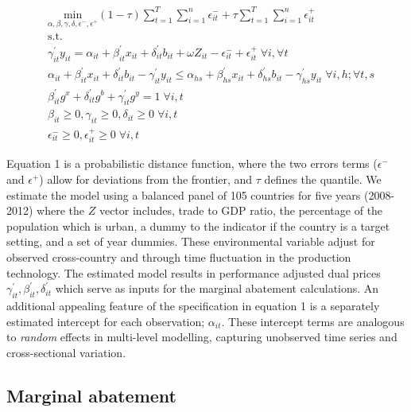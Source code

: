 \documentclass[
  10pt,
]{article}
\begin{document}
\begin{equation}
\begin{split}
& \underset{\alpha,\beta,\gamma,\delta,\epsilon^-,\epsilon^+}{\text{min}}
 (1-\tau) \sum^{T}_{t=1} \sum^{n}_{i=1}\epsilon^-_{it} + \tau \sum^{T}_{t=1}  \sum^{n}_{i=1}\epsilon^+_{it}  \\
&\text{s.t.} \\
&\gamma^{'}_{it}y_{it}=\alpha_{it}+\beta^{'}_{it}x_{it}+\delta^{'}_{it}b_{it} + \omega Z_{it} -\epsilon^-_{it}+\epsilon^+_{it} \; \forall i ,\forall t \\
&\alpha_{it}+\beta^{'}_{it}x_{it}+\delta^{'}_{it}b_{it}-\gamma^{'}_{it}y_{it} \leq \alpha_{hs}+\beta^{'}_{hs}x_{it}+\delta^{'}_{hs}b_{it}-\gamma^{'}_{hs}y_{it} \; \forall i,h ; \forall t,s \\
& \beta^{'}_{it}g^x+\delta^{'}_{it}g^b+\gamma^{'}_{it}g^y=1 \; \forall i,t\\
& \beta_{it} \geq0,\gamma_{it} \geq0,\delta_{it} \geq0 \; \forall i,t \\
& \epsilon^-_{it} \geq0, \epsilon^+_{it} \geq 0 \; \forall i,t
\end{split}
\end{equation}

Equation 1 is a probabilistic distance function, where the two errors
terms (\(\epsilon^-\) and \(\epsilon^+\)) allow for deviations from the
frontier, and \(\tau\) defines the quantile. We estimate the model using
a balanced panel of 105 countries for five years (2008-2012) where the
\(Z\) vector includes, trade to GDP ratio, the percentage of the
population which is urban, a dummy to the indicator if the country is a
target setting, and a set of year dummies. These environmental variable
adjust for observed cross-country and through time fluctuation in the
production technology. The estimated model results in performance
adjusted dual prices \(\gamma^{'}_{it},\beta^{'}_{it} ,\delta^{'}_{it}\)
which serve as inputs for the marginal abatement calculations. An
additional appealing feature of the specification in equation 1 is a
separately estimated intercept for each observation; \(\alpha_{it}\).
These intercept terms are analogous to \emph{random} effects in
multi-level modelling, capturing unobserved time series and
cross-sectional variation.

\hypertarget{marginal-abatement}{%
\subsection{Marginal abatement}\label{marginal-abatement}}
\end{document}
